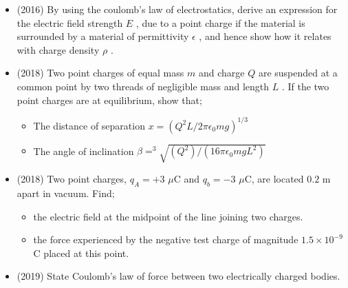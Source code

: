 \documentclass{article}
\begin{document}
\begin{itemize}
\item (2016)  By using the coulomb’s law of electrostatics, derive an expression for the electric field strength $ E$ , due to a point charge if the material is surrounded by a material of permittivity $ \epsilon $ , and hence show how it relates with charge density $ \rho $ .
\item (2018)  Two point charges of equal mass $ m$ and charge $ Q$ are suspended at a common point by two threads of negligible mass and length $ L$ . If the two point charges are at equilibrium,  show that;
 \begin{itemize}
\item The distance of separation $ x=({Q^{2}L}/{2\pi\epsilon _{0}mg})^{1/3}$
\item The angle of inclination $ \beta = ^{3}\sqrt{(Q^{2})/(16\pi\epsilon _{0}mgL^{2})}$ 
\end{itemize}
\item (2018)  Two point charges, $ q_{A}=+3$ $\mu$C and $ q_{b}=-3$ $\mu$C, are located $ 0.2$ m apart in vacuum. Find; 
 \begin{itemize}
\item the electric field at the midpoint of the line joining two charges. 
\item the force experienced by the negative test charge of magnitude $ 1.5 \times 10^{-9}$ C placed at this point.
\end{itemize}
\item (2019)  State Coulomb’s law of force between two electrically charged bodies. 
\end{itemize}
\end{document}

